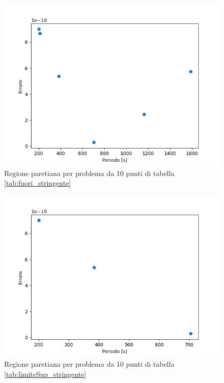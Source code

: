\documentclass[a4paper,12pt]{report}
\begin{document}
\begin{itemize}
  \begin{figure}[H]
    \centering
    \includegraphics[scale=0.70]{img/puls0010/lv_stringenti10.png}
    \caption{Regione paretiana per problema da 10 punti di tabella \ref{tab:fuori_stringente}}
    \label{fig:reg_ammis_10_0010_stringente}
  \end{figure}

  \begin{figure}[H]
    \centering
    \includegraphics[scale=0.70]{img/puls0013/lv_stingenti10.png}
    \caption{Regione paretiana per problema da 10 punti di tabella \ref{tab:limiteSup_stringente}}
    \label{fig:reg_ammis_10_0013_stringente}
  \end{figure}
\end{itemize}
\end{document}
